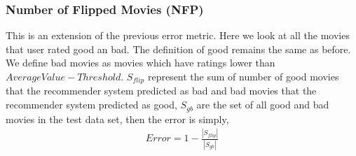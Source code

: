   \subsubsection{Number of Flipped Movies (NFP)}
  This is an extension of the previous error metric. Here we look at all the movies that user rated good an bad. The definition of good remains the same as before. We define bad movies as movies which have ratings lower than $AverageValue - Threshold$. $S_{flip}$ represent the sum of number of good movies that the recommender system predicted as bad and bad movies that the recommender system predicted as good, $S_{gb}$ are the set of all good and bad movies in the test data set, then the error is simply, 
  \begin{align*}
  Error = 1 - \frac{|S_{flip}|}{|S_{gb}|}
  \end{align*}

